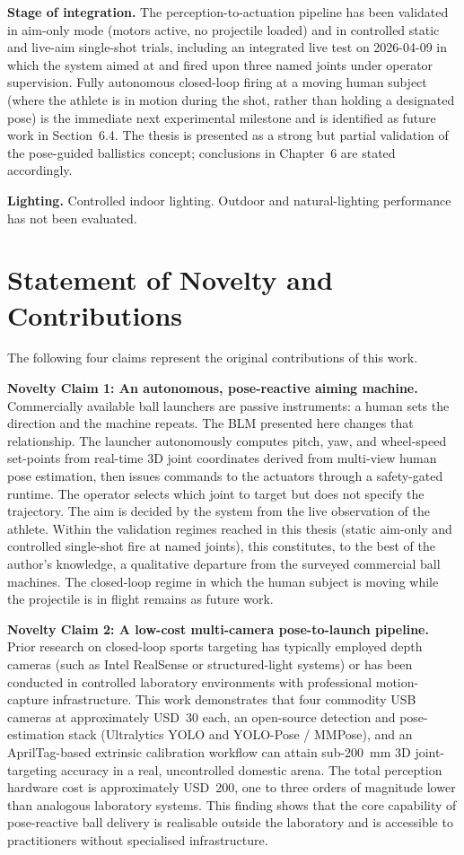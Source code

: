 \textbf{Stage of integration.} The perception-to-actuation pipeline has been validated in aim-only mode (motors active, no projectile loaded) and in controlled static and live-aim single-shot trials, including an integrated live test on 2026-04-09 in which the system aimed at and fired upon three named joints under operator supervision. Fully autonomous closed-loop firing at a moving human subject (where the athlete is in motion during the shot, rather than holding a designated pose) is the immediate next experimental milestone and is identified as future work in Section~6.4. The thesis is presented as a strong but partial validation of the pose-guided ballistics concept; conclusions in Chapter~6 are stated accordingly.

\textbf{Lighting.} Controlled indoor lighting. Outdoor and natural-lighting performance has not been evaluated.

\section{Statement of Novelty and Contributions}

The following four claims represent the original contributions of this work.

\textbf{Novelty Claim 1: An autonomous, pose-reactive aiming machine.}
Commercially available ball launchers are passive instruments: a human sets the direction and the machine repeats. The BLM presented here changes that relationship. The launcher autonomously computes pitch, yaw, and wheel-speed set-points from real-time 3D joint coordinates derived from multi-view human pose estimation, then issues commands to the actuators through a safety-gated runtime. The operator selects which joint to target but does not specify the trajectory. The aim is decided by the system from the live observation of the athlete. Within the validation regimes reached in this thesis (static aim-only and controlled single-shot fire at named joints), this constitutes, to the best of the author's knowledge, a qualitative departure from the surveyed commercial ball machines. The closed-loop regime in which the human subject is moving while the projectile is in flight remains as future work.

\textbf{Novelty Claim 2: A low-cost multi-camera pose-to-launch pipeline.}
Prior research on closed-loop sports targeting has typically employed depth cameras (such as Intel RealSense \cite{ref32} or structured-light systems) or has been conducted in controlled laboratory environments with professional motion-capture infrastructure. This work demonstrates that four commodity USB cameras at approximately USD~30 each, an open-source detection and pose-estimation stack (Ultralytics YOLO and YOLO-Pose / MMPose), and an AprilTag-based extrinsic calibration workflow can attain sub-200~mm 3D joint-targeting accuracy in a real, uncontrolled domestic arena. The total perception hardware cost is approximately USD~200, one to three orders of magnitude lower than analogous laboratory systems. This finding shows that the core capability of pose-reactive ball delivery is realisable outside the laboratory and is accessible to practitioners without specialised infrastructure.


